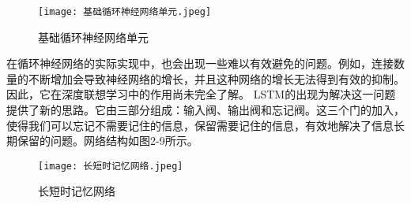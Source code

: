 \begin{figure}[hbt]
	\centering
	\texttt{[image: 基础循环神经网络单元.jpeg]}
	\caption{基础循环神经网络单元}
	\label{f.example}
\end{figure}

在循环神经网络的实际实现中，也会出现一些难以有效避免的问题。例如，连接数量的不断增加会导致神经网络的增长，并且这种网络的增长无法得到有效的抑制。因此，它在深度联想学习中的作用尚未完全了解。 LSTM\cite{hochreiter1997long}的出现为解决这一问题提供了新的思路。它由三部分组成：输入阀、输出阀和忘记阀。这三个门的加入，使得我们可以忘记不需要记住的信息，保留需要记住的信息，有效地解决了信息长期保留的问题。网络结构如图2-9所示。

\begin{figure}[hbt]
	\centering
	\texttt{[image: 长短时记忆网络.jpeg]}
	\caption{长短时记忆网络}
	\label{f.example}
\end{figure}


